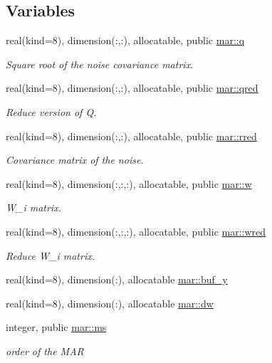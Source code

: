 \subsection*{Variables}
\begin{DoxyCompactItemize}
\item 
real(kind=8), dimension(\+:,\+:), allocatable, public \hyperlink{namespacemar_a92dfc55f0e9c6d1fc05f03f30df2e526}{mar\+::q}
\begin{DoxyCompactList}\small\item\em Square root of the noise covariance matrix. \end{DoxyCompactList}\item 
real(kind=8), dimension(\+:,\+:), allocatable, public \hyperlink{namespacemar_a0fa33035c3ff86abcb91dfaf29dd90d4}{mar\+::qred}
\begin{DoxyCompactList}\small\item\em Reduce version of Q. \end{DoxyCompactList}\item 
real(kind=8), dimension(\+:,\+:), allocatable, public \hyperlink{namespacemar_a315f9c1483809c1c037c88242c5d85e7}{mar\+::rred}
\begin{DoxyCompactList}\small\item\em Covariance matrix of the noise. \end{DoxyCompactList}\item 
real(kind=8), dimension(\+:,\+:,\+:), allocatable, public \hyperlink{namespacemar_aed76f863f30ab18ba428596d2157163d}{mar\+::w}
\begin{DoxyCompactList}\small\item\em W\+\_\+i matrix. \end{DoxyCompactList}\item 
real(kind=8), dimension(\+:,\+:,\+:), allocatable, public \hyperlink{namespacemar_af8cb3185ff947cb6540a6b33838e23d7}{mar\+::wred}
\begin{DoxyCompactList}\small\item\em Reduce W\+\_\+i matrix. \end{DoxyCompactList}\item 
real(kind=8), dimension(\+:), allocatable \hyperlink{namespacemar_a91d79995717316d4fcea39b2e476324c}{mar\+::buf\+\_\+y}
\item 
real(kind=8), dimension(\+:), allocatable \hyperlink{namespacemar_a5fbf8b9142fbfce9bdd17cb573a448c3}{mar\+::dw}
\item 
integer, public \hyperlink{namespacemar_a12c0dbfaa748dffd1cd2f96b19b53102}{mar\+::ms}
\begin{DoxyCompactList}\small\item\em order of the M\+AR \end{DoxyCompactList}\end{DoxyCompactItemize}
